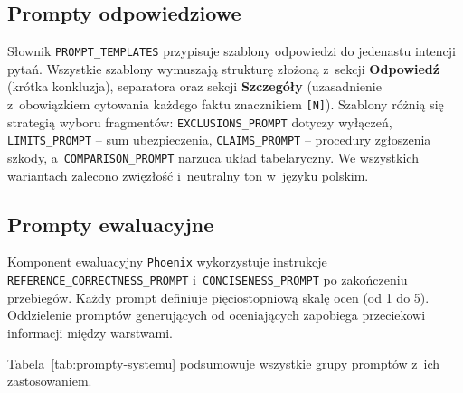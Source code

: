 \subsection{Prompty odpowiedziowe}\label{subsec:prompty-odpowiedziowe}

Słownik \texttt{PROMPT\_TEMPLATES} przypisuje szablony odpowiedzi do jedenastu
intencji pytań. Wszystkie szablony wymuszają strukturę złożoną z~sekcji
\textbf{Odpowiedź} (krótka konkluzja), separatora oraz sekcji
\textbf{Szczegóły} (uzasadnienie z~obowiązkiem cytowania każdego faktu
znacznikiem \texttt{[N]}). Szablony różnią się strategią wyboru fragmentów:
\texttt{EXCLUSIONS\_PROMPT} dotyczy wyłączeń, \texttt{LIMITS\_PROMPT} -- sum
ubezpieczenia, \texttt{CLAIMS\_PROMPT} -- procedury zgłoszenia szkody,
a~\texttt{COMPARISON\_PROMPT} narzuca układ tabelaryczny. We wszystkich
wariantach zalecono zwięzłość i~neutralny ton w~języku polskim.

\subsection{Prompty ewaluacyjne}\label{subsec:prompty-ewaluacyjne}

Komponent ewaluacyjny \texttt{Phoenix} wykorzystuje instrukcje
\texttt{REFERENCE\_CORRECTNESS\_PROMPT} i~\texttt{CONCISENESS\_PROMPT} po
zakończeniu przebiegów. Każdy prompt definiuje pięciostopniową skalę ocen (od 1
do 5). Oddzielenie promptów generujących od oceniających zapobiega przeciekowi
informacji między warstwami.

Tabela~\ref{tab:prompty-systemu} podsumowuje wszystkie grupy promptów z~ich
zastosowaniem.

